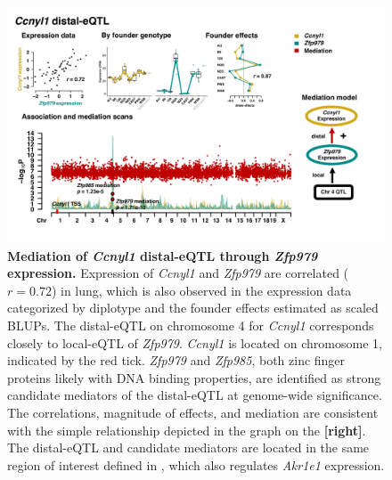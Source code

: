 \documentclass[9pt,twocolumn,twoside]{gsajnl}
\begin{document}
\begin{figure}[hp]
\renewcommand{\familydefault}{\sfdefault}\normalfont
\centering
\includegraphics[width=\textwidth, trim={0in 0.5in 0in 0in}, clip]{figs/ccnyl1_mediation.pdf}
\caption{\textbf{Mediation of \textit{Ccnyl1} distal-eQTL through \textit{Zfp979} expression.} Expression of \textit{Ccnyl1} and \textit{Zfp979} are correlated ($r = 0.72$) in lung, which is also observed in the expression data categorized by diplotype and the founder effects estimated as scaled BLUPs. The distal-eQTL on chromosome 4 for \textit{Ccnyl1} corresponds closely to local-eQTL of \textit{Zfp979}. \textit{Ccnyl1} is located on chromosome 1, indicated by the red tick. \textit{Zfp979} and \textit{Zfp985}, both zinc finger proteins likely with DNA binding properties, are identified as strong candidate mediators of the distal-eQTL at genome-wide significance. The correlations, magnitude of effects, and mediation are consistent with the simple relationship depicted in the graph on the \textbf{[right]}. The distal-eQTL and candidate mediators are located in the same region of interest defined in \cite{HamiltonWilliams2013}, which also regulates \textit{Akr1e1} expression. 
\label{fig:ccnyl1_exmediation}}
\end{figure}
\end{document}

